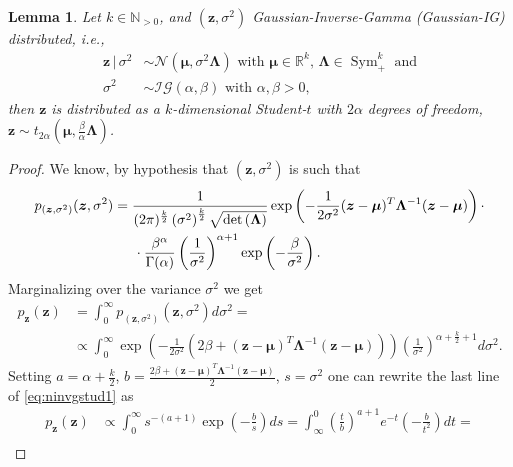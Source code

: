 \documentclass[a4paper, 11pt, reqno]{amsart}
\theoremstyle{plain}
\newtheorem{lemma}[theorem]{Lemma}
\theoremstyle{remark}
\theoremstyle{definition}
\newcommand{\given}{\, | \,}
\newcommand{\normal}[2]{\mathcal{N}\left(#1, #2\right)}
\newcommand{\invgamma}[2]{\mathcal{IG}\left(#1, #2\right)}
\newcommand{\tstud}[3]{t_{#1}\left(#2, #3\right)}
\newcommand{\real}{\mathbb{R}}
\renewcommand{\natural}{\mathbb{N}}
\renewcommand{\exp}[1]{\operatorname{exp}\left(#1\right)}
\renewcommand{\det}[1]{\operatorname{det}\left(#1\right)}
\newcommand{\blankeq}{\kern14.65pt}
\begin{document}
\begin{lemma} \label{lem:norminvgammastudent}
	Let $k \in \natural_{> 0}$, and $(\bm{z}, \sigma^2)$ Gaussian-Inverse-Gamma (Gaussian-IG) distributed, i.e.,
	\begin{align*}
		\bm{z} \given \sigma^2 & \sim \normal{\bm{\mu}}{\sigma^2 \bm{\Lambda}} \text{ with } \bm{\mu} \in \real^k, \, \bm{\Lambda} \in \operatorname{Sym}_+^{k} \text{ and} \\
		\sigma^2 & \sim \invgamma{\alpha}{\beta} \text{ with } \alpha, \beta > 0,
	\end{align*}
	then $\bm{z}$ is distributed as a $k$-dimensional Student-$t$ with $2 \alpha$ degrees of freedom, $\bm{z} \sim \tstud{2\alpha}{\bm{\mu}}{\frac{\beta}{\alpha} \bm{\Lambda}}$.
\end{lemma}
\begin{proof}
	We know, by hypothesis that $(\bm{z}, \sigma^2)$ is such that
	\begin{align*}
		p_{(\bm{z}, \sigma^2)}(\bm{z}, \sigma^2) & = \frac{1}{(2 \pi)^{\frac{k}{2}} \left(\sigma^2\right)^{\frac{k}{2}} \sqrt{\det{\bm{\Lambda}}}} \exp{-\frac{1}{2 \sigma^2} (\bm{z} - \bm{\mu})^T \bm{\Lambda}^{-1} (\bm{z} - \bm{\mu})} \cdot \\
		& \blankeq \cdot \frac{\beta^\alpha}{\Gamma(\alpha)} \left(\frac{1}{\sigma^2}\right)^{\alpha + 1} \exp{-\frac{\beta}{\sigma^2}}.
	\end{align*}
	Marginalizing over the variance $\sigma^2$ we get
	\begin{equation} \label{eq:ninvgstud1}
		\begin{aligned}
			p_{\bm{z}}(\bm{z}) & = \int_{0}^{\infty} p_{(\bm{z}, \sigma^2)}(\bm{z}, \sigma^2) d \sigma^2 = \\
			& \propto \int_{0}^{\infty} \exp{-\frac{1}{2 \sigma^2} \left(2 \beta + (\bm{z} - \bm{\mu})^T \bm{\Lambda}^{-1} (\bm{z} - \bm{\mu})\right)} \left(\frac{1}{\sigma^2}\right)^{\alpha + \frac{k}{2} + 1} d \sigma^2.
		\end{aligned}
	\end{equation}
	Setting $a = \alpha + \frac{k}{2}$, $b = \frac{2 \beta + (\bm{z} - \bm{\mu})^T \bm{\Lambda}^{-1} (\bm{z} - \bm{\mu})}{2}$, $s = \sigma^2$ one can rewrite the last line of \cref{eq:ninvgstud1} as 
	\begin{equation} \label{eq:ninvgstud2}
		\begin{aligned}
			p_{\bm{z}}(\bm{z}) & \propto \int_{0}^{\infty} s^{-(a + 1)} \exp{-\frac{b}{s}} d s = \int_{\infty}^{0} \left(\frac{t}{b}\right)^{a + 1} e^{-t} \left(-\frac{b}{t^2}\right) dt = \\

\end{aligned}
\end{equation}
\end{proof}
\end{document}
